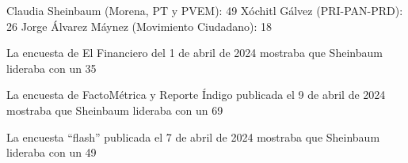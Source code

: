 Claudia Sheinbaum (Morena, PT y PVEM): 49%
Xóchitl Gálvez (PRI-PAN-PRD): 26%
Jorge Álvarez Máynez (Movimiento Ciudadano): 18%


La encuesta de El Financiero del 1 de abril de 2024 mostraba que Sheinbaum lideraba con un 35%

La encuesta de FactoMétrica y Reporte Índigo publicada el 9 de abril de 2024 mostraba que Sheinbaum lideraba con un 69%

La encuesta “flash” publicada el 7 de abril de 2024 mostraba que Sheinbaum lideraba con un 49%